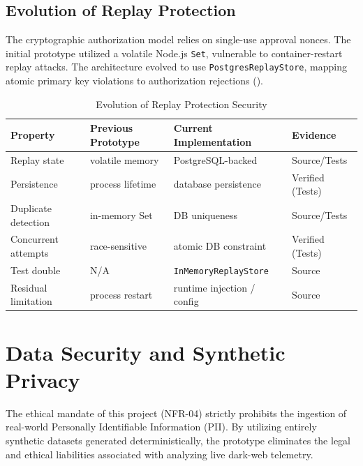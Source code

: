 \subsection{Evolution of Replay Protection}
\label{sec:security-replay-evolution}
The cryptographic authorization model relies on single-use approval nonces. The initial prototype utilized a volatile 
Node.js \texttt{Set}, vulnerable to container-restart replay attacks. The architecture evolved to use 
\texttt{PostgresReplayStore}, mapping atomic primary key violations to authorization rejections ().

\begin{table}[htpb]
\centering
\begin{tabular}{p{3.5cm} p{3cm} p{4cm} p{3cm}}
\toprule
\textbf{Property} & \textbf{Previous Prototype} & \textbf{Current Implementation} & \textbf{Evidence} \\
\midrule
Replay state & volatile memory & PostgreSQL-backed & Source/Tests \\
Persistence & process lifetime & database persistence & Verified (Tests) \\
Duplicate detection & in-memory Set & DB uniqueness & Source/Tests \\
Concurrent attempts & race-sensitive & atomic DB constraint & Verified (Tests) \\
Test double & N/A & \texttt{InMemoryReplayStore} & Source \\
Residual limitation & process restart & runtime injection / config & Source \\
\bottomrule
\end{tabular}
\caption{Evolution of Replay Protection Security}
\label{tab:security-replay}
\end{table}

\section{Data Security and Synthetic Privacy}
\label{sec:sec-synthetic-privacy}
The ethical mandate of this project (NFR-04) strictly prohibits the ingestion of real-world Personally Identifiable 
Information (PII). By utilizing entirely synthetic datasets generated deterministically, the prototype eliminates the 
legal and ethical liabilities associated with analyzing live dark-web telemetry.

